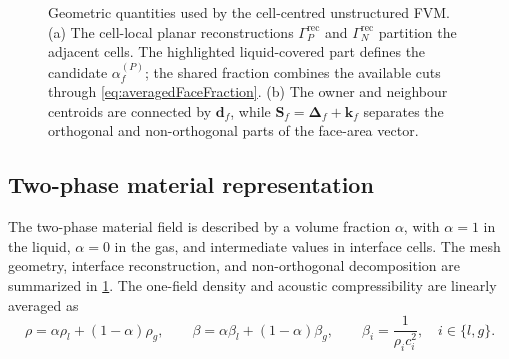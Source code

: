 \documentclass[final,12pt,nopreprintline,longtitle]{elsarticle}
\newcommand{\Sf}{\mathbf{S}_f}
\newcommand{\betaac}{\beta}
\begin{document}
\begin{figure}[t]
{%
    }
    \caption{Geometric quantities used by the cell-centred unstructured FVM.
    (a) The cell-local planar reconstructions $\Gamma_P^{\mathrm{rec}}$ and
    $\Gamma_N^{\mathrm{rec}}$ partition the adjacent cells.  The highlighted
    liquid-covered part defines the candidate $\alpha_f^{(P)}$; the shared
    fraction combines the available cuts through \cref{eq:averagedFaceFraction}.
    (b) The owner and neighbour centroids are connected
    by $\mathbf d_f$, while
    $\Sf=\boldsymbol{\Delta}_f+\mathbf k_f$ separates the orthogonal and
    non-orthogonal parts of the face-area vector.}
    \label{fig:unstructuredFVMSchematic}
\end{figure}

\subsection{Two-phase material representation}
\label{sec:materialRepresentation}

The two-phase material field is described by a volume fraction $\alpha$, with
$\alpha=1$ in the liquid, $\alpha=0$ in the gas, and intermediate values
in interface cells.  The mesh geometry, interface reconstruction, and
non-orthogonal decomposition are summarized in
\cref{fig:unstructuredFVMSchematic}.  The one-field density and acoustic
compressibility are linearly averaged as
\begin{equation}
    \rho=\alpha\rho_l+(1-\alpha)\rho_g,
    \qquad
    \betaac
    =\alpha\betaac_l+(1-\alpha)\betaac_g,
    \qquad
    \betaac_i=\frac{1}{\rho_i c_i^2},\quad i\in\{l,g\}.
    \label{eq:materialAverages}
\end{equation}
\end{document}
